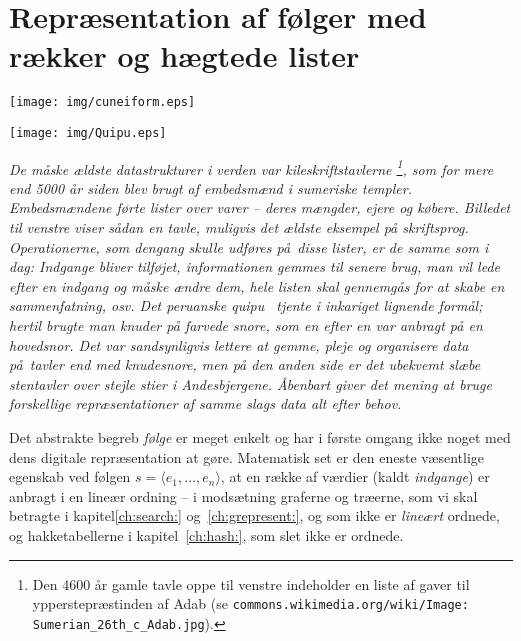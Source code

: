 \chapter{Repræsentation af følger med rækker og hægtede lister}
\renewcommand{\labelprefix}{ch:sequence}
\llabel{}

\vspace*{-2.5cm}
\begin{minipage}{0.5\textwidth}
\begin{flushleft}
  \texttt{[image: img/cuneiform.eps]}
\end{flushleft}
\end{minipage}
\begin{minipage}{0.5\textwidth}
\begin{flushright}
\texttt{[image: img/Quipu.eps]} 
\end{flushright}
\end{minipage}
\vspace*{0.5cm}

\noindent
\emph{De måske ældste datastrukturer i verden var kileskriftstavlerne%
\footnote{%
Den 4600 år gamle tavle oppe til venstre indeholder en liste af gaver til ypperstepræstinden af Adab (se \texttt{commons.wikimedia.org/wiki/Image: Sumerian\_26th\_c\_Adab.jpg}).
},
som for mere end 5000 år siden blev brugt af embedsmænd i sumeriske templer.
Embedsmændene førte lister over varer -- deres mængder, ejere og købere.
Billedet til venstre viser sådan en tavle, muligvis det ældste eksempel på skriftsprog.
Operationerne, som dengang skulle udføres på disse lister, er de samme som i dag:
Indgange bliver tilføjet, informationen gemmes til senere brug, man vil lede efter en indgang og  måske ændre dem, hele listen skal gennemgås for at skabe en sammenfatning, osv.
Det peruanske quipu~\cite{cuipi} tjente i inkariget lignende formål;
hertil brugte man knuder på farvede snore, som en efter en var anbragt på en hovedsnor.
Det var sandsynligvis lettere at gemme, pleje og organisere data på tavler end med knudesnore, men på den anden side er det ubekvemt slæbe stentavler over stejle stier i Andesbjergene.
Åbenbart giver det mening at bruge forskellige repræsentationer af samme slags data alt efter behov.
}

\bigskip\noindent
Det abstrakte begreb \emph{følge} er meget enkelt og har i første omgang ikke noget med dens digitale repræsentation at gøre.
Matematisk set er den eneste væsentlige egenskab ved følgen $s = \langle e_1,\ldots, e_n\rangle$, at en række af værdier (kaldt \emph{indgange}) er anbragt i en lineær ordning -- i modsætning graferne og træerne, som vi skal betragte i kapitel\ref{ch:search:} og~\ref{ch:grepresent:},
og som ikke er \emph{lineært} ordnede, og hakketabellerne i kapitel~\ref{ch:hash:}, som slet ikke er ordnede.

